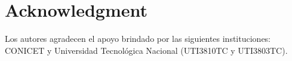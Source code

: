 \documentclass[journal]{IEEEtran}
\begin{document}
\section*{Acknowledgment}

Los autores agradecen el apoyo brindado por las siguientes instituciones: CONICET y Universidad Tecnol\'ogica Nacional (UTI3810TC y UTI3803TC).


\ifCLASSOPTIONcaptionsoff
  \newpage
\fi





%
%
%





% 
\end{document}
